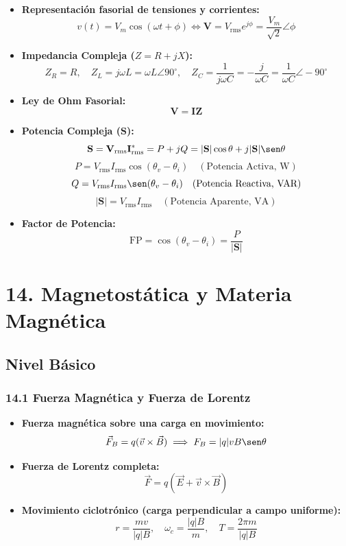 \documentclass[11pt,a4paper]{article}
\begin{document}
\begin{itemize}
  \item \textbf{Representación fasorial de tensiones y corrientes:}
  \[
    v(t) = V_m \cos(\omega t + \phi) \iff \mathbf{V} = V_{\text{rms}} e^{j\phi} = \frac{V_m}{\sqrt{2}} \angle \phi
  \]
  \item \textbf{Impedancia Compleja ($Z = R + jX$):}
  \[
    Z_R = R, \quad Z_L = j\omega L = \omega L \angle 90^\circ, \quad Z_C = \frac{1}{j\omega C} = -\frac{j}{\omega C} = \frac{1}{\omega C} \angle -90^\circ
  \]
  \item \textbf{Ley de Ohm Fasorial:}
  \[
    \mathbf{V} = \mathbf{I} \mathbf{Z}
  \]
  \item \textbf{Potencia Compleja ($\mathbf{S}$):}
  \[
    \mathbf{S} = \mathbf{V}_{\text{rms}} \mathbf{I}_{\text{rms}}^* = P + j Q = |\mathbf{S}| \cos\theta + j |\mathbf{S}| \sen\theta
  \]
  \[
    P = V_{\text{rms}} I_{\text{rms}} \cos(\theta_v - \theta_i) \quad (\text{Potencia Activa, W})
  \]
  \[
    Q = V_{\text{rms}} I_{\text{rms}} \sen(\theta_v - \theta_i) \quad (\text{Potencia Reactiva, VAR})
  \]
  \[
    |\mathbf{S}| = V_{\text{rms}} I_{\text{rms}} \quad (\text{Potencia Aparente, VA})
  \]
  \item \textbf{Factor de Potencia:}
  \[
    \text{FP} = \cos(\theta_v - \theta_i) = \frac{P}{|\mathbf{S}|}
  \]
\end{itemize}

\section*{14. Magnetostática y Materia Magnética}

\subsection*{Nivel Básico}

\subsubsection*{14.1 Fuerza Magnética y Fuerza de Lorentz}

\begin{itemize}
  \item \textbf{Fuerza magnética sobre una carga en movimiento:}
  \[
    \vec{F}_B = q (\vec{v} \times \vec{B}) \implies F_B = |q| v B \sen\theta
  \]
  \item \textbf{Fuerza de Lorentz completa:}
  \[
    \vec{F} = q (\vec{E} + \vec{v} \times \vec{B})
  \]
  \item \textbf{Movimiento ciclotrónico (carga perpendicular a campo uniforme):}
  \[
    r = \frac{m v}{|q| B}, \quad \omega_c = \frac{|q| B}{m}, \quad T = \frac{2\pi m}{|q| B}
  \]
\end{itemize}
\end{document}
